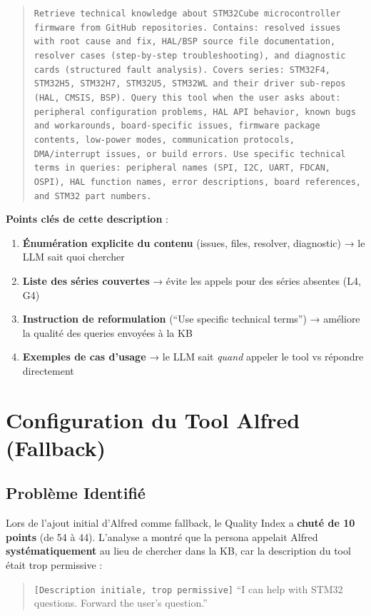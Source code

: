 \documentclass[12pt,a4paper]{report}
\begin{document}
\begin{quote}
\small\texttt{Retrieve technical knowledge about STM32Cube microcontroller firmware from GitHub repositories. Contains: resolved issues with root cause and fix, HAL/BSP source file documentation, resolver cases (step-by-step troubleshooting), and diagnostic cards (structured fault analysis). Covers series: STM32F4, STM32H5, STM32H7, STM32U5, STM32WL and their driver sub-repos (HAL, CMSIS, BSP). Query this tool when the user asks about: peripheral configuration problems, HAL API behavior, known bugs and workarounds, board-specific issues, firmware package contents, low-power modes, communication protocols, DMA/interrupt issues, or build errors. Use specific technical terms in queries: peripheral names (SPI, I2C, UART, FDCAN, OSPI), HAL function names, error descriptions, board references, and STM32 part numbers.}
\end{quote}

\textbf{Points clés de cette description} :
\begin{enumerate}
  \item \textbf{Énumération explicite du contenu} (issues, files, resolver, diagnostic) → le LLM sait quoi chercher
  \item \textbf{Liste des séries couvertes} → évite les appels pour des séries absentes (L4, G4)
  \item \textbf{Instruction de reformulation} (``Use specific technical terms'') → améliore la qualité des queries envoyées à la KB
  \item \textbf{Exemples de cas d'usage} → le LLM sait \textit{quand} appeler le tool vs répondre directement
\end{enumerate}

\section{Configuration du Tool Alfred (Fallback)}

\subsection{Problème Identifié}

Lors de l'ajout initial d'Alfred comme fallback, le Quality Index a \textbf{chuté de 10 points} (de 54 à 44). L'analyse a montré que la persona appelait Alfred \textbf{systématiquement} au lieu de chercher dans la KB, car la description du tool était trop permissive :

\begin{quote}
\small\texttt{[Description initiale, trop permissive]} ``I can help with STM32 questions. Forward the user's question.''
\end{quote}
\end{document}
